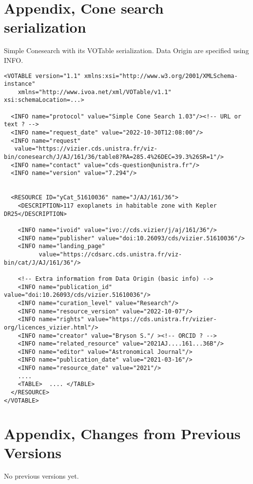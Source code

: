 \documentclass[11pt,a4paper]{ivoa}
\begin{document}
\section{Appendix, Cone search serialization}\label{appendixA}
Simple Conesearch with its VOTable serialization. Data Origin are specified using  INFO.
\begin{verbatim}
<VOTABLE version="1.1" xmlns:xsi="http://www.w3.org/2001/XMLSchema-instance"
    xmlns="http://www.ivoa.net/xml/VOTable/v1.1" xsi:schemaLocation=...>

  <INFO name="protocol" value="Simple Cone Search 1.03"/><!-- URL or text ? -->
  <INFO name="request_date" value="2022-10-30T12:08:00"/>
  <INFO name="request" 
   value="https://vizier.cds.unistra.fr/viz-bin/conesearch/J/AJ/161/36/table8?RA=285.4%26DEC=39.3%26SR=1"/>
  <INFO name="contact" value="cds-question@unistra.fr"/>
  <INFO name="version" value="7.294"/>


  <RESOURCE ID="yCat_51610036" name="J/AJ/161/36">
    <DESCRIPTION>117 exoplanets in habitable zone with Kepler DR25</DESCRIPTION>

    <INFO name="ivoid" value="ivo://cds.vizier/j/aj/161/36"/>
    <INFO name="publisher" value="doi:10.26093/cds/vizier.51610036"/>
    <INFO name="landing_page" 
          value="https://cdsarc.cds.unistra.fr/viz-bin/cat/J/AJ/161/36"/>

    <!-- Extra information from Data Origin (basic info) -->
    <INFO name="publication_id" value="doi:10.26093/cds/vizier.51610036"/>
    <INFO name="curation_level" value="Research"/>
    <INFO name="resource_version" value="2022-10-07"/>
    <INFO name="rights" value="https://cds.unistra.fr/vizier-org/licences_vizier.html"/>
    <INFO name="creator" value="Bryson S."/ ><!-- ORCID ? -->
    <INFO name="related_resource" value="2021AJ....161...36B"/>
    <INFO name="editor" value="Astronomical Journal"/>
    <INFO name="publication_date" value="2021-03-16"/>
    <INFO name="resource_date" value="2021"/>
    ....
    <TABLE>  .... </TABLE>
  </RESOURCE>
</VOTABLE>
\end{verbatim}

\section{Appendix, Changes from Previous Versions}

No previous versions yet.  






\end{document}
